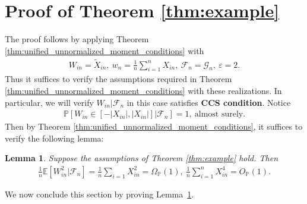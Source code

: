 \documentclass[12pt]{article}
\newtheorem{lemma}{Lemma}
\theoremstyle{definition}
\def\P{\mathbb{P}}
\def\P{\mathbb{P}}
\newcommand{\E}{\mathbb E}								%
\renewcommand{\P}{\mathbb{P}}							%
\begin{document}
	\section{Proof of Theorem \ref{thm:example}}\label{sec:proof_example}

	The proof follows by applying Theorem \ref{thm:unified_unnormalized_moment_conditions} with 
	\begin{align*}
		W_{in}=\widetilde{X}_{in},\ w_n=\frac{1}{n}\sum_{i=1}^n X_{in},\ \mathcal{F}_n=\mathcal{G}_n,\ \varepsilon=2.
	\end{align*}
	Thus it suffices to verify the assumptions required in Theorem \ref{thm:unified_unnormalized_moment_conditions} with these realizations. In particular, we will verify $W_{in}|\mathcal{F}_n$ in this case satisfies \textbf{CCS condition}. Notice 
	\begin{align*}
		\P[W_{in}\in [-|X_{in}|,|X_{in}|]|\mathcal{F}_n]=1,\ \text{almost surely}.
	\end{align*}
	Then by Theorem \ref{thm:unified_unnormalized_moment_conditions}, it suffices to verify the following lemma:
	\begin{lemma}\label{lem:moment_verification}
		Suppose the assumptions of Theorem \ref{thm:example} hold. Then 
		\begin{align*}
			\frac{1}{n}\E[W_{in}^2|\mathcal{F}_n]=\frac{1}{n}\sum_{i=1}X_{in}^2=\Omega_{\P}(1),\ \frac{1}{n}\sum_{i=1}^n X_{in}^4=O_{\P}(1).
		\end{align*}
	\end{lemma}
	\noindent We now conclude this section by proving Lemma~\ref{lem:moment_verification}.
	
\end{document}
